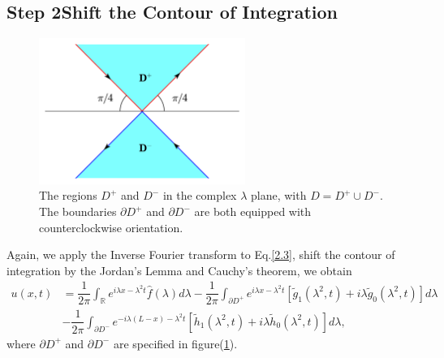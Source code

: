 \documentclass[12pt]{article}
\numberwithin{equation}{section}
\begin{document}
\subsection{Step 2\textemdash Shift the Contour of Integration}
\begin{figure}[h]
    \centering \hspace{5mm}
    \includegraphics[width=0.60\textwidth]{D^+.pic.jpg}
    \caption{The regions $D^+$ and $D^-$ in the complex $\lambda$ plane, with $D=D^+\cup D^-$. The boundaries $\partial D^+$ and $\partial D^-$ are both equipped with counterclockwise orientation.}
    \label{4}
\end{figure}
Again, we apply the Inverse Fourier transform to Eq.\eqref{2.3}, shift the contour of integration by the Jordan's Lemma and Cauchy's theorem, we obtain
\begin{equation}\label{2.5}
    \begin{split}
        u(x,t)&=\dfrac{1}{2\pi}\int_{\mathbb{R}} e^{i\lambda x-\lambda^2 t} \hat{f}(\lambda)d\lambda-\dfrac{1}{2\pi}\int_{\partial D^+} e^{i\lambda x-\lambda^2 t}[\tilde{g}_1(\lambda^2,t)+i\lambda\tilde{g}_0(\lambda^2,t)]d\lambda\\
        &-\dfrac{1}{2\pi}\int_{\partial D^-} e^{-i\lambda(L-x)-\lambda^2 t}[\tilde{h}_1(\lambda^2,t)+i\lambda\tilde{h}_0(\lambda^2,t)]d\lambda,
    \end{split}
\end{equation}
where $\partial D^+$ and $\partial D^-$ are specified in figure(\ref{4}).
\end{document}
